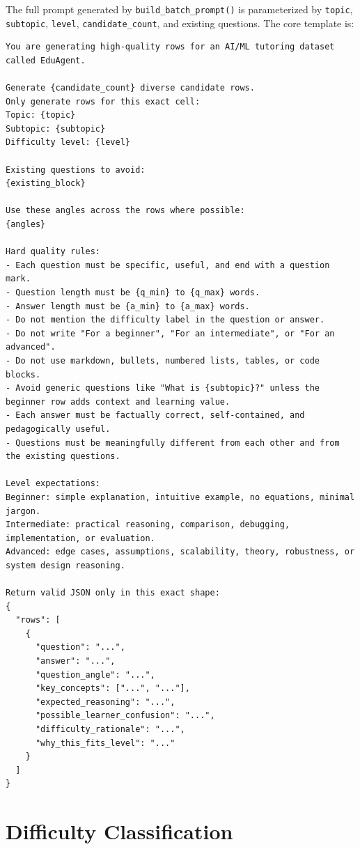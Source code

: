 \documentclass[11pt,a4paper]{article}
\begin{document}
The full prompt generated by \texttt{build\_batch\_prompt()} is parameterized by \texttt{topic}, \texttt{subtopic}, \texttt{level}, \texttt{candidate\_count}, and existing questions. The core template is:

\begin{lstlisting}
You are generating high-quality rows for an AI/ML tutoring dataset called EduAgent.

Generate {candidate_count} diverse candidate rows.
Only generate rows for this exact cell:
Topic: {topic}
Subtopic: {subtopic}
Difficulty level: {level}

Existing questions to avoid:
{existing_block}

Use these angles across the rows where possible:
{angles}

Hard quality rules:
- Each question must be specific, useful, and end with a question mark.
- Question length must be {q_min} to {q_max} words.
- Answer length must be {a_min} to {a_max} words.
- Do not mention the difficulty label in the question or answer.
- Do not write "For a beginner", "For an intermediate", or "For an advanced".
- Do not use markdown, bullets, numbered lists, tables, or code blocks.
- Avoid generic questions like "What is {subtopic}?" unless the beginner row adds context and learning value.
- Each answer must be factually correct, self-contained, and pedagogically useful.
- Questions must be meaningfully different from each other and from the existing questions.

Level expectations:
Beginner: simple explanation, intuitive example, no equations, minimal jargon.
Intermediate: practical reasoning, comparison, debugging, implementation, or evaluation.
Advanced: edge cases, assumptions, scalability, theory, robustness, or system design reasoning.

Return valid JSON only in this exact shape:
{
  "rows": [
    {
      "question": "...",
      "answer": "...",
      "question_angle": "...",
      "key_concepts": ["...", "..."],
      "expected_reasoning": "...",
      "possible_learner_confusion": "...",
      "difficulty_rationale": "...",
      "why_this_fits_level": "..."
    }
  ]
}
\end{lstlisting}

\section{Difficulty Classification}
\end{document}
